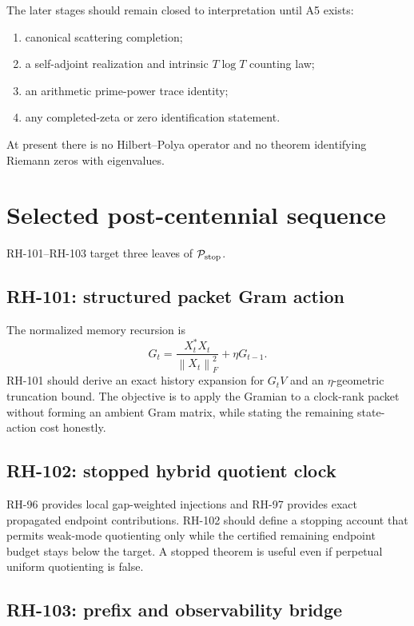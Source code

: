 \documentclass[11pt]{article}
\theoremstyle{definition}
\theoremstyle{remark}
\newcommand{\norm}[1]{\left\lVert#1\right\rVert}
\begin{document}
The later stages should remain closed to interpretation until A5 exists:
\begin{enumerate}[leftmargin=2em]
\item canonical scattering completion;
\item a self-adjoint realization and intrinsic $T\log T$ counting law;
\item an arithmetic prime-power trace identity;
\item any completed-zeta or zero identification statement.
\end{enumerate}
At present there is no Hilbert--Polya operator and no theorem identifying
Riemann zeros with eigenvalues.

\section{Selected post-centennial sequence}
\label{sec:next}

RH-101--RH-103 target three leaves of
$\mathcal P_{\rm stop}$.

\subsection{RH-101: structured packet Gram action}

The normalized memory recursion is
\[
 G_t=\frac{X_t^*X_t}{\norm{X_t}_F^2}+\eta G_{t-1}.
\]
RH-101 should derive an exact history expansion for $G_tV$ and an
$\eta$-geometric truncation bound.  The objective is to apply the Gramian to
a clock-rank packet without forming an ambient Gram matrix, while stating the
remaining state-action cost honestly.

\subsection{RH-102: stopped hybrid quotient clock}

RH-96 provides local gap-weighted injections and RH-97 provides exact
propagated endpoint contributions.  RH-102 should define a stopping account
that permits weak-mode quotienting only while the certified remaining endpoint
budget stays below the target.  A stopped theorem is useful even if perpetual
uniform quotienting is false.

\subsection{RH-103: prefix and observability bridge}
\end{document}
